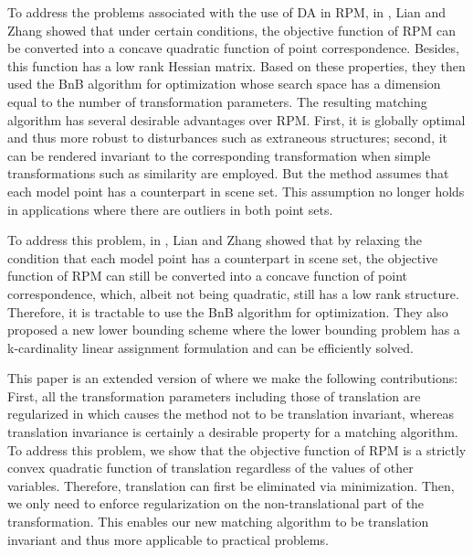 \documentclass[11pt,bezier,]{article}
\begin{document}
To address the problems associated with the use of DA in RPM,
in \cite{RPM_concave},
Lian and Zhang showed that under certain conditions,
the objective function of RPM can be converted into 
a concave quadratic function of point correspondence.
Besides, 
this function has 
a low rank Hessian matrix.
Based on these properties,
they then used the BnB algorithm for optimization
whose  search space has a dimension equal to the number of transformation parameters.
The resulting matching algorithm has several desirable advantages over  RPM. 
First, it is globally optimal and thus  more robust to disturbances such as extraneous structures; 
second, it can be rendered invariant to the corresponding transformation 
when simple transformations such as similarity  are employed. 
But the method assumes that each model point  has a counterpart in  scene  set.
This assumption no longer  holds in applications where there are outliers in both point sets.

To address this problem,
in \cite{RPM_model_occlude},
Lian and Zhang showed that
by relaxing the condition  that each model point  has a counterpart in  scene set,
the objective function of RPM can still be converted into a concave function of point correspondence,
which, albeit not being quadratic,
still has a low rank structure.
Therefore,
it is tractable to use the BnB algorithm  for optimization.
They also proposed a new lower bounding scheme
where the lower bounding problem has a  k-cardinality linear assignment formulation
and can be efficiently solved.




This paper is an extended version of  \cite{RPM_model_occlude}
where we make the following contributions:
First,
all the transformation parameters including those of translation are regularized in \cite{RPM_model_occlude}
which causes the method not to be  translation invariant,
whereas translation invariance is certainly a desirable property for a matching algorithm.
To address this problem,
we show that the objective function of RPM is a strictly convex quadratic function of translation
regardless of the values of other variables.
Therefore, translation can first be eliminated via minimization.
Then, 
we only need to enforce  regularization on the non-translational part of the transformation.
This enables  our new  matching algorithm to be translation invariant
and thus more applicable to practical  problems.
\end{document}
